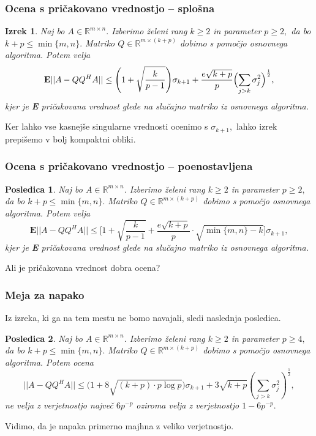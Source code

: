 \documentclass{beamer}
\newtheorem{izrek}{Izrek}
\newtheorem{posledica}{Posledica}
\begin{document}
\begin{frame}
\frametitle{Ocena s pričakovano vrednostjo -- splošna}

\begin{izrek}
Naj bo $A \in \mathbb{R}^{m \times n}.$ Izberimo želeni rang $k \geq 2$ in parameter $p \geq 2,$ da bo $k+p \leq \min\{m,n\}.$ Matriko $Q  \in \mathbb{R}^{m \times (k+p)}$ dobimo s pomočjo osnovnega algoritma. Potem velja 
$$\textbf{E}||A - QQ^HA|| \leq \Biggl (1 + \sqrt{\frac{k}{p-1}} \Biggr ) \sigma_{k+1} + \frac{e\sqrt{k+p}}{p} \Bigl ( \sum_{j>k} \sigma_j^2 \Bigr)^{\frac{1}{2}},$$
kjer je \textbf{E} pričakovana vrednost glede na slučajno matriko iz osnovnega algoritma.
\end{izrek}

Ker lahko vse kasnejše singularne vrednosti ocenimo s $\sigma_{k+1},$ lahko izrek prepišemo v bolj kompaktni obliki.

\end{frame}
\begin{frame}
\frametitle{Ocena s pričakovano vrednostjo -- poenostavljena}

\begin{posledica}
Naj bo $A \in \mathbb{R}^{m \times n}.$ Izberimo želeni rang $k \geq 2$ in parameter $p \geq 2,$ da bo $k+p \leq \min\{m,n\}.$ Matriko $Q  \in \mathbb{R}^{m \times (k+p)}$ dobimo s pomočjo osnovnega algoritma. Potem velja 
$$\textbf{E}||A - QQ^HA|| \leq \Biggl [1 + \sqrt{\frac{k}{p-1}} + \frac{e\sqrt{k+p}}{p} \cdot \sqrt{\min \{m,n\} - k} \Biggr ] \sigma_{k+1},$$ 
kjer je \textbf{E} pričakovana vrednost glede na slučajno matriko iz osnovnega algoritma.
\end{posledica}

Ali je pričakovana vrednost dobra ocena? 

\end{frame}
\begin{frame}
\frametitle{Meja za napako}

Iz izreka, ki ga na tem mestu ne bomo navajali, sledi naslednja posledica.

\begin{posledica}
Naj bo $A \in \mathbb{R}^{m \times n}.$ Izberimo želeni rang $k \geq 2$ in parameter $p \geq 4,$ da bo $k+p \leq \min\{m,n\}.$ Matriko $Q  \in \mathbb{R}^{m \times (k+p)}$ dobimo s pomočjo osnovnega algoritma. Potem ocena
 $$||A - QQ^HA|| \leq \Big ( 1 +8\sqrt{(k+p)\cdot p \log p} \Bigr ) \sigma_{k+1} + 3 \sqrt{k+p} (\sum_{j>k} \sigma_j^2)^{\frac{1}{2}},$$ 
ne velja z verjetnostjo največ $6p^{-p}$ oziroma velja z verjetnostjo $1 - 6p^{-p}.$
\end{posledica}

Vidimo, da je napaka primerno majhna z veliko verjetnostjo. 
\end{frame}
\end{document}
